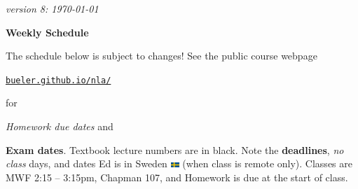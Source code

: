 \documentclass[12pt]{article}
\newcommand{\vacinline}[1]{{\color{OliveGreen} \textsl{#1}}}
\newcommand{\due}[1]{\strut {\color{BrickRed} \textsl{#1}}}
\newcommand{\ee}[1]{\strut {\color{Blue} \textbf{#1}}}
\newcommand{\dlinline}[1]{{\color{Purple} \textbf{#1}}}
\begin{document}
\hfill \small \emph{version 8: \today} \normalsize

\bigskip\bigskip
\centerline{\Large \textbf{Weekly Schedule}}

\bigskip
The schedule below is subject to changes!  See the public course webpage

\medskip

\centerline{\href{https://bueler.github.io/nla/index.html}{\texttt{bueler.github.io/nla/}}}

\noindent for \due{Homework due dates} and \ee{Exam dates}.  Textbook lecture numbers are in black.  Note the \dlinline{deadlines}, \vacinline{no class} days, and dates Ed is in Sweden \includegraphics[width=12px]{sweden.png} (when class is remote only).  Classes are MWF 2:15 -- 3:15pm, Chapman 107, and Homework is due at the start of class.

\bigskip
\end{document}
